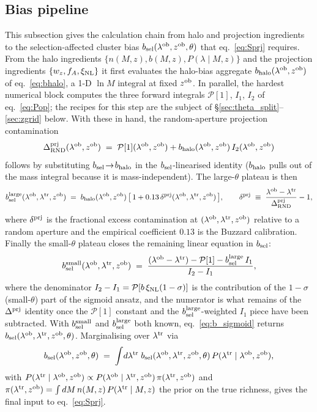 \documentclass[a4paper, 11pt]{article}
\newcommand{\lob}{\lambda^{\rm ob}}
\newcommand{\ltr}{\lambda^{\rm tr}}
\newcommand{\zob}{z^{\rm ob}}
\newcommand{\dprj}{\Delta^{\rm prj}}
\newcommand{\xinl}{\xi_{\rm NL}}
\newcommand{\Pop}{\mathcal{P}}
\newcommand{\bsel}{b_{\rm sel}}
\newcommand{\bhalo}{b_{\rm halo}}
\newcommand{\bsmall}{b_{\rm sel}^{\rm small}}
\newcommand{\blarge}{b_{\rm sel}^{\rm large}}
\begin{document}
\subsection{Bias pipeline}
\label{sec:pipeline}

This subsection gives the calculation chain from halo and
projection ingredients to the selection-affected cluster bias
\(\bsel(\lob,\zob,\theta)\) that
eq.~\eqref{eq:Sprj} requires. From the halo
ingredients \(\{n(M,z), b(M,z), P(\lambda\mid M,z)\}\) and the
projection ingredients \(\{w_z, f_A, \xinl\}\) it first evaluates
the halo-bias aggregate \(\bhalo(\lob,\zob)\) of
eq.~\eqref{eq:bhalo}, a 1-D \(\ln M\) integral at fixed \(\zob\).
In parallel, the hardest numerical block computes the three
forward integrals \(\Pop[1]\), \(I_1\), \(I_2\) of
eq.~\eqref{eq:Pop}; the recipes for this step are the subject of
\S\ref{sec:theta_split}--\ref{sec:zgrid} below. With these in hand, the random-aperture
projection contamination
\begin{equation}
\dprj_{\rm RND}(\lob,\zob) \;=\; \Pop[1](\lob,\zob)
                              + \bhalo(\lob,\zob)\,I_2(\lob,\zob)
\label{eq:dprj_rnd}
\end{equation}
follows by substituting \(\bsel\!\to\!\bhalo\) in the
\(\bsel\)-linearised identity (\(\bhalo\) pulls out of the mass
integral because it is mass-independent). The large-\(\theta\)
plateau is then
\begin{equation}
\blarge(\lob,\ltr,\zob) \;=\; \bhalo(\lob,\zob)\,
  \bigl[\,1 + 0.13\,\delta^{\rm prj}(\lob,\ltr,\zob)\,\bigr],
\qquad
\delta^{\rm prj} \;\equiv\; \frac{\lob-\ltr}{\dprj_{\rm RND}} - 1,
\label{eq:b_infty}
\end{equation}
where \(\delta^{\rm prj}\) is the fractional excess contamination
at \((\lob,\ltr,\zob)\) relative to a random aperture and the
empirical coefficient \(0.13\) is the Buzzard calibration. Finally
the small-\(\theta\) plateau closes the remaining linear equation
in \(\bsel\):
\begin{equation}
\bsmall(\lob,\ltr,\zob) \;=\;
\frac{(\lob-\ltr) - \Pop[1] - \blarge\,I_1}{I_2 - I_1},
\label{eq:b_small}
\end{equation}
where the denominator \(I_2-I_1 = \Pop[b\,\xinl(1-\sigma)]\) is the
contribution of the \(1-\sigma\) (small-\(\theta\)) part of the
sigmoid ansatz, and the numerator is what remains of the
\(\dprj\) identity once the \(\Pop[1]\) constant and the
\(\blarge\)-weighted \(I_1\) piece have been subtracted. With
\(\bsmall\) and \(\blarge\) both known, eq.~\eqref{eq:b_sigmoid}
returns \(\bsel(\lob,\ltr,\zob,\theta)\). Marginalising over
\(\ltr\) via
\begin{equation}
\bsel(\lob,\zob,\theta) \;=\;
\int\!d\ltr\;\bsel(\lob,\ltr,\zob,\theta)\,
P(\ltr\mid\lob,\zob),
\label{eq:b_marg_lt}
\end{equation}
with \(P(\ltr\mid\lob,\zob)\propto P(\lob\mid\ltr,\zob)\,
\pi(\ltr,\zob)\) and
\(\pi(\ltr,\zob) = \int dM\,n(M,z)\,P(\ltr\mid M,z)\) the prior on
the true richness, gives the final input to
eq.~\eqref{eq:Sprj}.
\end{document}
